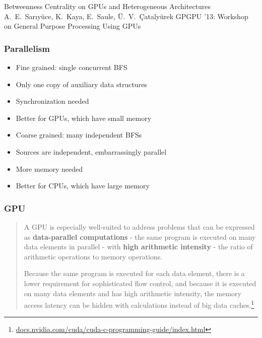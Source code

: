 \begin{frame}
  \centering
  \vfill
  {\huge Betweenness Centrality on GPUs and Heterogeneous Architectures}
  \vfill
  {\Large A.~E.~Sar\i y\"uce, K.~Kaya, E.~Saule, \"U.~V.~\c{C}ataly\"urek}
  \vfill
  {\large GPGPU '13: Workshop on General Purpose Processing Using GPUs}
  \vfill
\end{frame}

\begin{frame}
  \frametitle{Parallelism}

  \begin{itemize}
    \item Fine grained: single concurrent BFS
    \item Only one copy of auxiliary data structures
    \item Synchronization needed
    \item Better for GPUs, which have small memory
  \end{itemize}
  \begin{itemize}
    \item Coarse grained: many independent BFSs
    \item Sources are independent, embarrassingly parallel
    \item More memory needed
    \item Better for CPUs, which have large memory
  \end{itemize}
\end{frame}

\begin{frame}
  \frametitle{GPU}

  \begin{quote}
    A GPU is especially well-suited to address problems that can be expressed as \textbf{data-parallel computations} - the same program is executed on many data elements in parallel - with \textbf{high arithmetic intensity} - the ratio of arithmetic operations to memory operations.

    Because the same program is executed for each data element, there is a lower requirement for sophisticated flow control, and because it is executed on many data elements and has high arithmetic intensity, the memory access latency can be hidden with calculations instead of big data caches.\footnote{\url{docs.nvidia.com/cuda/cuda-c-programming-guide/index.html}}
  \end{quote}
\end{frame}


